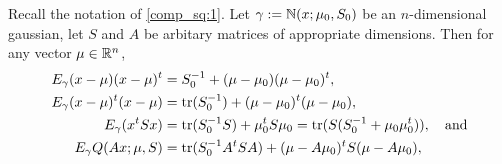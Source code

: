 \documentclass[12pt,leqno]{article}
\begin{document}
  \begin{Lem}\label{exp_log}
    Recall the notation of \eqref{comp_sq:1}. Let $\gamma := {\mathbb N}(x;\mu_0,S_0)$ be an $n$-dimensional gaussian,  let $S$
    and $A$ be arbitary matrices of appropriate dimensions. Then for any vector $\mu\in{\mathbb R}^n$, 
    \begin{align}
      E_{\gamma}(x-\mu)(x-\mu)^t &= S_0^{-1} + (\mu-\mu_0)(\mu-\mu_0)^t, \label{E_xx^t}\\
      E_{\gamma}(x-\mu)^t(x - \mu) &=  \text{\rm tr}(S_0^{-1}) + (\mu-\mu_0)^t(\mu-\mu_0), \label{E_x^tx}\\
      E_{\gamma}(x^tSx) &=\text{\rm tr}(S_0^{-1}S)+\mu_0^tS\mu_0 = \text{\rm tr}(S(S_0^{-1}+\mu_0\mu_0^t)), \quad\text{and} \label{E_x^tSx} \\
      E_{\gamma}{Q}(Ax;\mu,S) &=  \text{\rm tr}(S_0^{-1}A^tSA) + (\mu-A\mu_0)^tS(\mu-A\mu_0), \label{E_Q}
    \end{align}
  \end{Lem}
\end{document}
